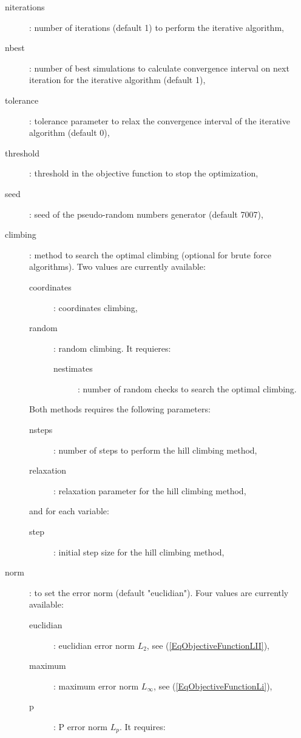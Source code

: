 \documentclass[a4paper]{report}
\begin{document}
\begin{description}
\begin{description}
	\end{description}
	\item[niterations]: number of iterations (default 1) to perform the
		iterative algorithm,
	\item[nbest]: number of best simulations to calculate convergence interval
		on next iteration for the iterative algorithm (default 1),
	\item[tolerance]: tolerance parameter to relax the convergence interval of
		the iterative algorithm (default 0),
	\item[threshold]: threshold in the objective function to stop the
		optimization,
	\item[seed]: seed of the pseudo-random numbers generator (default 7007),
	\item[climbing]: method to search the optimal climbing (optional for brute
		force algorithms). Two values are currently available:
	\begin{description}
		\item[coordinates]: coordinates climbing,
		\item[random]: random climbing. It requieres:
		\begin{description}
			\item[nestimates]: number of random checks to search the optimal
				climbing.
		\end{description}
	\end{description}
	Both methods requires the following parameters:
	\begin{description}
		\item[nsteps]: number of steps to perform the hill climbing method,
		\item[relaxation]: relaxation parameter for the hill climbing method,
	\end{description}
	and for each variable:
	\begin{description}
		\item[step]: initial step size for the hill climbing method,
	\end{description}
	\item[norm]: to set the error norm (default "euclidian"). Four values are
		currently available:
		\begin{description}
			\item[euclidian]: euclidian error norm $L_2$, see
				(\ref{EqObjectiveFunctionLII}),
			\item[maximum]: maximum error norm $L_\infty$, see
				(\ref{EqObjectiveFunctionLi}),
			\item[p]: P error norm $L_p$. It requires:

\end{description}
\end{description}
\end{document}
